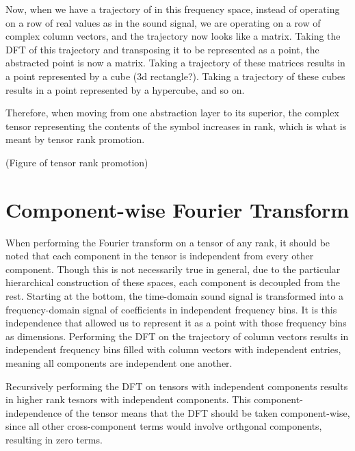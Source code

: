 Now, when we have a trajectory of in this frequency space, instead of operating on a row of real values as in the sound signal, we are operating on a row of complex column vectors, and the trajectory now looks like a matrix.  Taking the DFT of this trajectory and transposing it to be represented as a point, the abstracted point is now a matrix.  Taking a trajectory of these matrices results in a point represented by a cube (3d rectangle?).  Taking a trajectory of these cubes results in a point represented by a hypercube, and so on.

Therefore, when moving from one abstraction layer to its superior, the complex tensor representing the contents of the symbol increases in rank, which is what is meant by tensor rank promotion.

(Figure of tensor rank promotion)

\section{Component-wise Fourier Transform}
When performing the Fourier transform on a tensor of any rank, it should be noted that each component in the tensor is independent from every other component.  Though this is not necessarily true in general, due to the particular hierarchical construction of these spaces, each component is decoupled from the rest.  Starting at the bottom, the time-domain sound signal is transformed into a frequency-domain signal of coefficients in independent frequency bins.  It is this independence that allowed us to represent it as a point with those frequency bins as dimensions.  Performing the DFT on the trajectory of column vectors results in independent frequency bins filled with column vectors with independent entries, meaning all components are independent one another.

Recursively performing the DFT on tensors with independent components results in higher rank tesnors with independent components.  This component-independence of the tensor means that the DFT should be taken component-wise, since all other cross-component terms would involve orthgonal components, resulting in zero terms.
